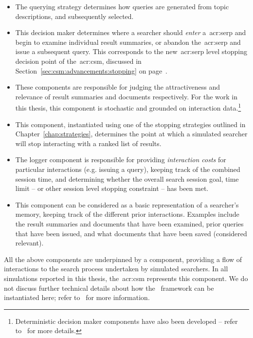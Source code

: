 \begin{itemize}
    \item{ The querying strategy determines how queries are generated from topic descriptions, and subsequently selected.}
    \item{ This decision maker determines where a searcher should \emph{enter} a~\gls{acr:serp} and begin to examine individual result summaries, or abandon the~\gls{acr:serp} and issue a subsequent query. This corresponds to the new~\gls{acr:serp} level stopping decision point of the~\gls{acr:csm}, discussed in Section~\ref{sec:csm:advancements:stopping} on page~\pageref{sec:csm:advancements:stopping}.}
    \item{ These components are responsible for judging the attractiveness and relevance of result summaries and documents respectively. For the work in this thesis, this component is stochastic and grounded on interaction data.\footnote{Deterministic decision maker components have also been developed -- refer to~\citep{maxwell2016agents} for more details.}}
    \item{ This component, instantiated using one of the stopping strategies outlined in Chapter~\ref{chap:strategies}, determines the point at which a simulated searcher will stop interacting with a ranked list of results.}
    \item{ The logger component is responsible for providing \emph{interaction costs} for particular interactions (e.g. issuing a query), keeping track of the combined session time, and determining whether the overall search session goal, time limit -- or other session level stopping constraint -- has been met.}
    \item{ This component can be considered as a basic representation of a searcher's memory, keeping track of the different prior interactions. Examples include the result summaries and documents that have been examined, prior queries that have been issued, and what documents that have been saved (considered relevant).}
\end{itemize}

All the above components are underpinned by a  component, providing a flow of interactions to the search process undertaken by simulated searchers. In all simulations reported in this thesis, the~\gls{acr:csm} represents this component. We do not discuss further technical details about how the \simiir~framework can be instantiated here; refer to~\cite{maxwell2016simiir} for more information.

